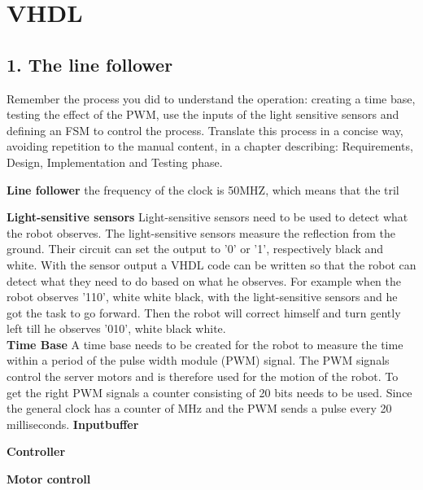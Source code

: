 \chapter{VHDL}

\section{1. The line follower}
Remember the process you did to understand the operation: creating a time base, testing the effect of the PWM, use the inputs of the light sensitive sensors and defining an FSM to control the process.
Translate this process in a concise way, avoiding repetition to the manual content, in a chapter describing: Requirements, Design, Implementation and Testing phase.

\textbf{Line follower}
the frequency of the clock is 50MHZ, which means that the tril

\textbf{Light-sensitive sensors}
Light-sensitive sensors need to be used to detect what the robot observes. The light-sensitive sensors measure the reflection from the ground. Their circuit can set the output to '0' or '1', respectively black and white. With the sensor output a VHDL code can be written so that the robot can detect what they need to do based on what he observes. For example when the robot observes '110', white white black, with the light-sensitive sensors and he got the task to go forward. Then the robot will correct himself and turn gently left till he observes '010', white black white.\\

\textbf{Time Base}
A time base needs to be created for the robot to measure the time within a period of the pulse width module (PWM) signal. The PWM signals control the server motors and is therefore used for the motion of the robot. To get the right PWM signals a counter consisting of 20 bits needs to be used. Since the general clock has a counter of MHz and the PWM sends a pulse every 20 milliseconds. 
\textbf{Inputbuffer}

\textbf{Controller}


\textbf{Motor controll}

\\
\\


